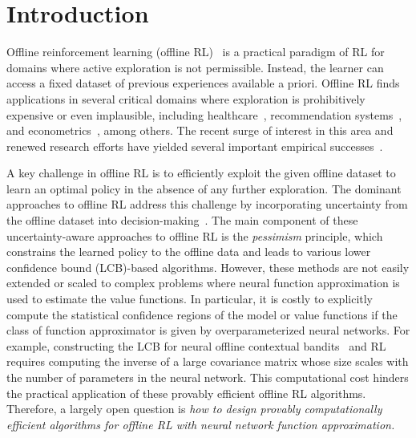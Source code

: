 \documentclass{article} \usepackage{iclr2023/iclr2023_conference,times}
\begin{document}
\section{Introduction}
Offline reinforcement learning (offline RL)~\citep{lange2012batch,levine2020offline} is a practical paradigm of RL for domains where active exploration is not permissible. Instead, the learner can access a fixed dataset of previous experiences available a priori. Offline RL finds applications in several critical domains where exploration is prohibitively expensive or even implausible, including healthcare~\citep{gottesman2019guidelines, nie2021learning}, recommendation systems~\citep{strehl2010learning, thomasAAAI17}, and  econometrics~\citep{Kitagawa18, athey2021policy}, among others. The recent surge of interest in this area and renewed research efforts have yielded several important empirical successes~\citep{chen2021decision, wang2022diffusion, wang2022bootstrapped, meng2021offline}. 



A key challenge in offline RL is to efficiently exploit the given offline dataset to learn an optimal policy in the absence of any further exploration. The dominant approaches to offline RL address this challenge by incorporating uncertainty from the offline dataset into  decision-making~\citep{buckman2020importance, jin2021pessimism, xiao2021optimality, nguyen2021offline, ghasemipour2022so, an2021uncertainty, bai2022pessimistic}. The main component of these uncertainty-aware approaches to offline RL is the \emph{pessimism} principle, which constrains the learned policy to the offline data and leads to various lower confidence bound (LCB)-based algorithms. However, these methods are not easily extended or scaled to complex problems where neural function approximation is used to estimate the value functions. In particular, it is costly to explicitly compute the statistical confidence regions of the model or value functions if the class of function approximator is given by overparameterized neural networks. For example, constructing the LCB for neural offline contextual bandits~\citep{nguyen2021offline} and RL \citep{xu2022provably} requires computing the inverse of a large covariance matrix whose size scales with the number of parameters in the neural network. This computational cost hinders the practical application of these provably efficient offline RL algorithms. Therefore, a largely open question is \emph{how to design provably  computationally efficient algorithms for offline RL with neural network function approximation.} 
\end{document}

